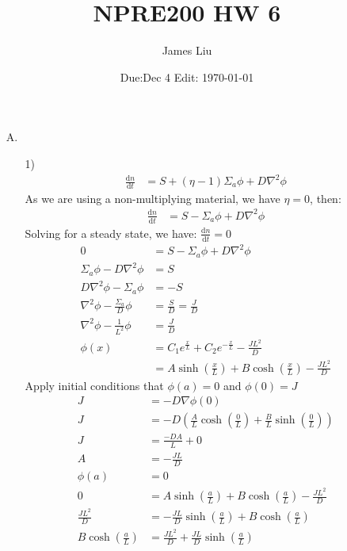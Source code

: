 \documentclass{article}
\date{Due:Dec 4 Edit: \today}
\title{NPRE200 HW 6}
\author{James Liu}
\begin{document}
\maketitle
\begin{itemize}
    \item [A.]
    \begin{itemize}
        \item [1)]
        \begin{align*}
            \frac{\text{d} n}{\text{d} t}&=S+(\eta-1)\Sigma_a\phi+D\nabla^2\phi
        \end{align*}
        As we are using a non-multiplying material, we have \(\eta=0\), then:
        \begin{align*}
            \frac{\text{d} n}{\text{d} t}&=S-\Sigma_a\phi+D\nabla^2\phi
        \end{align*}
        Solving for a steady state, we have: \(\frac{\text{d} n}{\text{d} t}=0\)
        \begin{align*}
            0&=S-\Sigma_a\phi+D\nabla^2\phi\\
            \Sigma_a\phi-D\nabla^2\phi&=S\\
            D\nabla^2\phi-\Sigma_a\phi&=-S\\
            \nabla^2\phi-\frac{\Sigma_a}{D}\phi&=\frac{S}{D}=\frac{J}{D}\\
            \nabla^2\phi-\frac{1}{L^2}\phi&=\frac{J}{D}\\
            \phi(x)&=C_1e^{\frac{x}{L}}+C_2e^{-\frac{x}{L}}-\frac{JL^2}{D}\\
            &=A\sinh(\frac{x}{L})+B\cosh(\frac{x}{L})-\frac{JL^2}{D}
        \end{align*}
        Apply initial conditions that \(\phi(a)=0\) and \(\phi(0)=J\)
        \begin{align*}
            J&=-D\nabla \phi(0)\\
            J&=-D\left(\frac{A}{L}\cosh\left(\frac{0}{L}\right)+\frac{B}{L}\sinh\left(\frac{0}{L}\right)\right)\\
            J&=\frac{-DA}{L}+0\\
            A&=-\frac{JL}{D}\\
            \phi(a)&=0\\
            0&=A\sinh\left(\frac{a}{L}\right)+B\cosh\left(\frac{a}{L}\right)-\frac{JL^2}{D}\\
            \frac{JL^2}{D}&=-\frac{JL}{D}\sinh\left(\frac{a}{L}\right)+B\cosh\left(\frac{a}{L}\right)\\
            B\cosh\left(\frac{a}{L}\right)&=\frac{JL^2}{D}+\frac{JL}{D}\sinh\left(\frac{a}{L}\right)\\

\end{align*}
\end{itemize}
\end{itemize}
\end{document}
